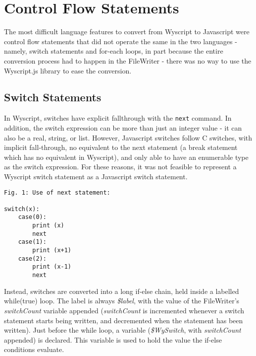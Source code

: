 \chapter{Control Flow Statements}

The most difficult language features to convert from Wyscript to Javascript were control flow statements that did not operate the same in the two languages - namely, switch statements and for-each loops, in part because the entire conversion process had to happen in the FileWriter - there was no way to use the Wyscript.js library to ease the conversion.


\section{Switch Statements}
\label{c_control_switch}

In Wyscript, switches have explicit fallthrough with the \lstinline{next} command. In addition, the switch expression can be more than just an integer value - it can also be a real, string, or list. However, Javascript switches follow C switches, with implicit fall-through, no equivalent to the next statement (a break statement which has no equivalent in Wyscript), and only able to have an enumerable type as the switch expression. For these reasons, it was not feasible to represent a Wyscript switch statement as a Javascript switch statement.\\

\begin{lstlisting}
Fig. 1: Use of next statement:

switch(x):
    case(0):
        print (x)
        next
    case(1):
        print (x+1)
    case(2):
        print (x-1)
        next
\end{lstlisting}

Instead, switches are converted into a long if-else chain, held inside a labelled while(true) loop. The label is always {\em \$label}, with the value of the FileWriter's {\em switchCount} variable appended ({\em switchCount} is incremented whenever a switch statement starts being written, and decremented when the statement has been written). Just before the while loop, a variable ({\em \$WySwitch}, with {\em switchCount} appended) is declared. This variable is used to hold the value the if-else conditions evaluate.\pagebreak

